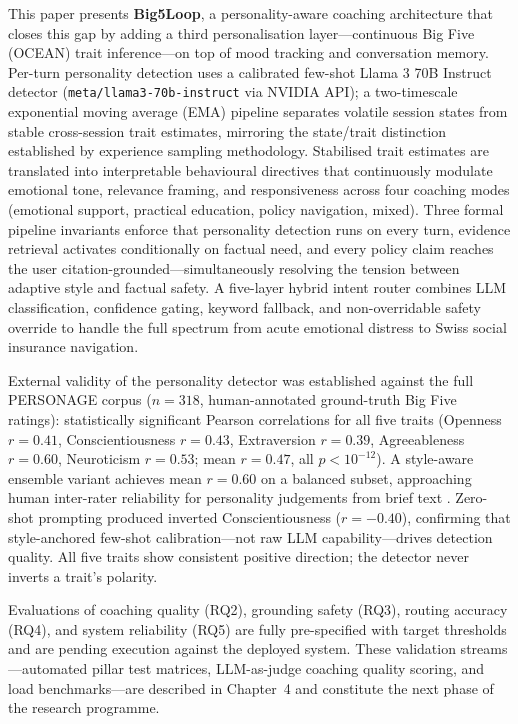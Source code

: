 \documentclass[10pt,a4paper]{report}
\begin{document}
This paper presents \textbf{Big5Loop}, a personality-aware coaching architecture that closes this gap by adding a third personalisation layer---continuous Big Five (OCEAN) trait inference---on top of mood tracking and conversation memory. Per-turn personality detection uses a calibrated few-shot Llama 3 70B Instruct detector \citep{Dubey2024} (\texttt{meta/llama3-70b-instruct} via NVIDIA API); a two-timescale exponential moving average (EMA) pipeline separates volatile session states from stable cross-session trait estimates, mirroring the state/trait distinction established by experience sampling methodology. Stabilised trait estimates are translated into interpretable behavioural directives that continuously modulate emotional tone, relevance framing, and responsiveness across four coaching modes (emotional support, practical education, policy navigation, mixed). Three formal pipeline invariants enforce that personality detection runs on every turn, evidence retrieval activates conditionally on factual need, and every policy claim reaches the user citation-grounded---simultaneously resolving the tension between adaptive style and factual safety. A five-layer hybrid intent router combines LLM classification, confidence gating, keyword fallback, and non-overridable safety override to handle the full spectrum from acute emotional distress to Swiss social insurance navigation.

External validity of the personality detector was established against the full PERSONAGE corpus ($n = 318$, human-annotated ground-truth Big Five ratings): statistically significant Pearson correlations for all five traits (Openness $r = 0.41$, Conscientiousness $r = 0.43$, Extraversion $r = 0.39$, Agreeableness $r = 0.60$, Neuroticism $r = 0.53$; mean $r = 0.47$, all $p < 10^{-12}$). A style-aware ensemble variant achieves mean $r = 0.60$ on a balanced subset, approaching human inter-rater reliability for personality judgements from brief text \citep{Mairesse2011}. Zero-shot prompting produced inverted Conscientiousness ($r = -0.40$), confirming that style-anchored few-shot calibration---not raw LLM capability---drives detection quality. All five traits show consistent positive direction; the detector never inverts a trait's polarity.

Evaluations of coaching quality (RQ2), grounding safety (RQ3), routing accuracy (RQ4), and system reliability (RQ5) are fully pre-specified with target thresholds and are pending execution against the deployed system. These validation streams---automated pillar test matrices, LLM-as-judge coaching quality scoring, and load benchmarks---are described in Chapter~4 and constitute the next phase of the research programme.
\end{document}
